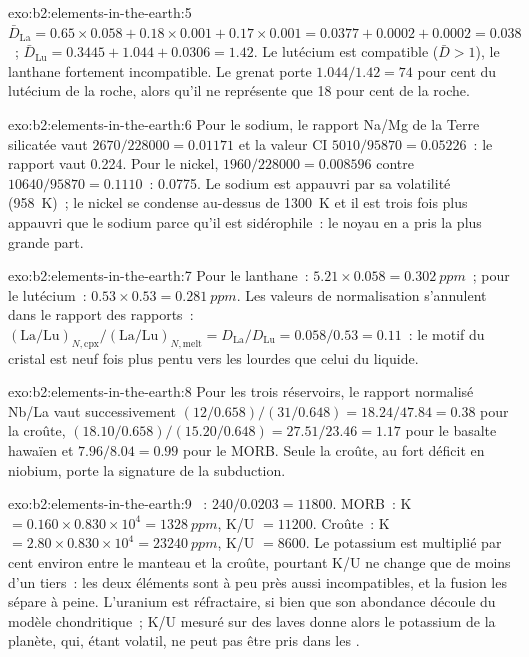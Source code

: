\begin{solution}{exo:b2:elements-in-the-earth:5}
$\bar D_{\mathrm{La}} = 0.65\times0.058+0.18\times0.001+0.17\times0.001 = 0.0377 +
0.0002 + 0.0002 = 0.038$~; $\bar D_{\mathrm{Lu}} = 0.3445+1.044+0.0306 = 1.42$. Le lutécium est
compatible ($\bar D > 1$), le lanthane fortement incompatible. Le grenat porte
$1.044/1.42 = 74$ pour cent du lutécium de la roche,
alors qu'il ne représente que 18 pour cent de la roche.
\end{solution}

\begin{solution}{exo:b2:elements-in-the-earth:6}
Pour le sodium, le rapport Na/Mg de la Terre silicatée vaut $2670/\num{228000} = 0.01171$ et la valeur CI $5010/\num{95870} = 0.05226$~: le rapport vaut 0.224. Pour le nickel, $1960/\num{228000}
= 0.008596$ contre $\num{10640}/\num{95870} = 0.1110$~: 0.0775. Le sodium est
appauvri par sa volatilité (\qty{958}{K})~; le nickel se condense
au-dessus de \qty{1300}{K} et il est trois fois plus appauvri que le sodium
parce qu'il est sidérophile~:
le noyau en a pris la plus grande part.
\end{solution}

\begin{solution}{exo:b2:elements-in-the-earth:7}
Pour le lanthane~: $5.21\times0.058 = \qty{0.302}{ppm}$~; pour le lutécium~: $0.53\times0.53 = \qty{0.281}{ppm}$.
Les valeurs de normalisation s'annulent dans le rapport des rapports~:
$(\mathrm{La}/\mathrm{Lu})_{N,\mathrm{cpx}}/(\mathrm{La}/\mathrm{Lu})_{N,\mathrm{melt}} =
D_{\mathrm{La}}/D_{\mathrm{Lu}} = 0.058/0.53 = 0.11$~: le motif du cristal est neuf fois plus pentu
vers les  lourdes que celui du liquide.
\end{solution}

\begin{solution}{exo:b2:elements-in-the-earth:8}
Pour les trois réservoirs, le rapport normalisé Nb/La vaut successivement $(12/0.658)/(31/0.648) = 18.24/47.84 = 0.38$ pour la croûte,
$(18.10/0.658)/(15.20/0.648) = 27.51/23.46 = 1.17$ pour le basalte hawaïen et $7.96/8.04 = 0.99$ pour le MORB.
Seule la croûte, au fort déficit en niobium, porte la signature de la subduction.
\end{solution}

\begin{solution}{exo:b2:elements-in-the-earth:9}
~: $240/0.0203 = \num{11800}$. MORB~: K $= 0.160\times0.830\times10^4 =
\qty{1328}{ppm}$, K/U $= \num{11200}$. Croûte~: K $= 2.80\times0.830\times10^4 =
\qty{23240}{ppm}$, K/U $= \num{8600}$. Le potassium est
multiplié par cent environ entre le manteau et la croûte, pourtant K/U ne change que de moins d'un tiers~: les deux éléments sont à peu près aussi incompatibles,
et la fusion les sépare à peine. L'uranium est réfractaire,
si bien que son abondance découle du modèle chondritique~; K/U mesuré sur des laves
donne alors le potassium de la planète, qui, étant volatil, ne peut pas être pris dans les .
\end{solution}

